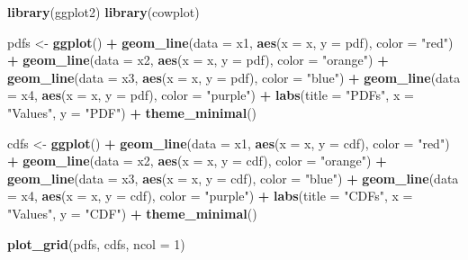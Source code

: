 \documentclass[
]{article}
\newenvironment{Shaded}{\begin{snugshade}}{\end{snugshade}}
\newcommand{\DataTypeTok}[1]{\textcolor[rgb]{0.13,0.29,0.53}{#1}}
\newcommand{\DecValTok}[1]{\textcolor[rgb]{0.00,0.00,0.81}{#1}}
\newcommand{\KeywordTok}[1]{\textcolor[rgb]{0.13,0.29,0.53}{\textbf{#1}}}
\newcommand{\NormalTok}[1]{#1}
\newcommand{\OperatorTok}[1]{\textcolor[rgb]{0.81,0.36,0.00}{\textbf{#1}}}
\newcommand{\StringTok}[1]{\textcolor[rgb]{0.31,0.60,0.02}{#1}}
\begin{document}
\begin{Shaded}
\begin{Highlighting}[]
\KeywordTok{library}\NormalTok{(ggplot2)}
\KeywordTok{library}\NormalTok{(cowplot)}

\NormalTok{pdfs \textless{}{-}}\StringTok{ }\KeywordTok{ggplot}\NormalTok{() }\OperatorTok{+}
\StringTok{  }\KeywordTok{geom\_line}\NormalTok{(}\DataTypeTok{data =}\NormalTok{ x1, }\KeywordTok{aes}\NormalTok{(}\DataTypeTok{x =}\NormalTok{ x, }\DataTypeTok{y =}\NormalTok{ pdf), }\DataTypeTok{color =} \StringTok{"red"}\NormalTok{) }\OperatorTok{+}
\StringTok{  }\KeywordTok{geom\_line}\NormalTok{(}\DataTypeTok{data =}\NormalTok{ x2, }\KeywordTok{aes}\NormalTok{(}\DataTypeTok{x =}\NormalTok{ x, }\DataTypeTok{y =}\NormalTok{ pdf), }\DataTypeTok{color =} \StringTok{"orange"}\NormalTok{) }\OperatorTok{+}
\StringTok{  }\KeywordTok{geom\_line}\NormalTok{(}\DataTypeTok{data =}\NormalTok{ x3, }\KeywordTok{aes}\NormalTok{(}\DataTypeTok{x =}\NormalTok{ x, }\DataTypeTok{y =}\NormalTok{ pdf), }\DataTypeTok{color =} \StringTok{"blue"}\NormalTok{) }\OperatorTok{+}
\StringTok{  }\KeywordTok{geom\_line}\NormalTok{(}\DataTypeTok{data =}\NormalTok{ x4, }\KeywordTok{aes}\NormalTok{(}\DataTypeTok{x =}\NormalTok{ x, }\DataTypeTok{y =}\NormalTok{ pdf), }\DataTypeTok{color =} \StringTok{"purple"}\NormalTok{) }\OperatorTok{+}
\StringTok{  }\KeywordTok{labs}\NormalTok{(}\DataTypeTok{title =} \StringTok{"PDFs"}\NormalTok{, }\DataTypeTok{x =} \StringTok{"Values"}\NormalTok{, }\DataTypeTok{y =} \StringTok{"PDF"}\NormalTok{) }\OperatorTok{+}
\StringTok{  }\KeywordTok{theme\_minimal}\NormalTok{()}


\NormalTok{cdfs \textless{}{-}}\StringTok{ }\KeywordTok{ggplot}\NormalTok{() }\OperatorTok{+}
\StringTok{  }\KeywordTok{geom\_line}\NormalTok{(}\DataTypeTok{data =}\NormalTok{ x1, }\KeywordTok{aes}\NormalTok{(}\DataTypeTok{x =}\NormalTok{ x, }\DataTypeTok{y =}\NormalTok{ cdf), }\DataTypeTok{color =} \StringTok{"red"}\NormalTok{) }\OperatorTok{+}
\StringTok{  }\KeywordTok{geom\_line}\NormalTok{(}\DataTypeTok{data =}\NormalTok{ x2, }\KeywordTok{aes}\NormalTok{(}\DataTypeTok{x =}\NormalTok{ x, }\DataTypeTok{y =}\NormalTok{ cdf), }\DataTypeTok{color =} \StringTok{"orange"}\NormalTok{) }\OperatorTok{+}
\StringTok{  }\KeywordTok{geom\_line}\NormalTok{(}\DataTypeTok{data =}\NormalTok{ x3, }\KeywordTok{aes}\NormalTok{(}\DataTypeTok{x =}\NormalTok{ x, }\DataTypeTok{y =}\NormalTok{ cdf), }\DataTypeTok{color =} \StringTok{"blue"}\NormalTok{) }\OperatorTok{+}
\StringTok{  }\KeywordTok{geom\_line}\NormalTok{(}\DataTypeTok{data =}\NormalTok{ x4, }\KeywordTok{aes}\NormalTok{(}\DataTypeTok{x =}\NormalTok{ x, }\DataTypeTok{y =}\NormalTok{ cdf), }\DataTypeTok{color =} \StringTok{"purple"}\NormalTok{) }\OperatorTok{+}
\StringTok{  }\KeywordTok{labs}\NormalTok{(}\DataTypeTok{title =} \StringTok{"CDFs"}\NormalTok{, }\DataTypeTok{x =} \StringTok{"Values"}\NormalTok{, }\DataTypeTok{y =} \StringTok{"CDF"}\NormalTok{) }\OperatorTok{+}
\StringTok{  }\KeywordTok{theme\_minimal}\NormalTok{()}

\KeywordTok{plot\_grid}\NormalTok{(pdfs, cdfs, }\DataTypeTok{ncol =} \DecValTok{1}\NormalTok{)}
\end{Highlighting}
\end{Shaded}
\end{document}
